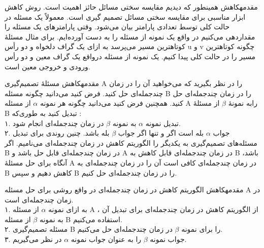 \begin{itemframe-s}{مقدمه}{کاهش}
\itm
همینطور که دیدیم مقایسه سختی مسائل حائز اهمیت است. روش کاهش ابزار مناسبی برای مقایسه سختی مسائل تصمیم گیری است.
\itm
معمولاً یک مسئله در حالت کلی توسط تعدادی پارامتر بیان می‌شود. وقتی پارامترهای یک مسئله را مقداردهی می‌کنیم در واقع یک نمونه
از مسئله را به دست آورده‌ایم.
\itm
برای مثال مسئلهٔ کوتاهترین مسیر می‌پرسد به ازای یک گراف دلخواه و دو رأس u و v چگونه کوتاهترین مسیر را در حالت کلی پیدا کنیم. یک نمونه از مسئله درواقع یک گراف معین و دو رأس ورودی و خروجی معین است.
\end{itemframe-s}

\begin{itemframe-s}{مقدمه}{کاهش}
\itm
مسئلهٔ تصمیم‌گیری A را در نظر بگیرید که می‌خواهید آن را در زمان چندجمله‌ای حل کنید.
\itm
فرض کنید می‌دانید چگونه مسئله B را در زمان چند‌جمله‌ای حل کنید.
\itm
همچنین فرض کنید می‌دانید چگونه هر نمونه
$\alpha$
از مسئله A رابه نمونهٔ
$\beta$
از مسئلهٔ B تبدیل کنید به طوری‌که :\\
۱. تبدیل نمونه
$\alpha$
به نمونه
$\beta$
در زمان چند‌جمله‌ای انجام شود.\\
۲. جواب
$\alpha$
بله است اگر و تنها اگر جواب
$\beta$
بله باشد.
\itm
چنین روندی برای تبدیل مسئله‌های تصمیم‌گیری به یکدیگر را الگوریتم کاهش در زمان چندجمله‌ای
می‌نامیم.
\itm
اگر B در زمان چندجمله‌ای قابل حل باشد و A در زمان چندجمله‌ای قابل کاهش به B باشد، آنگاه برای حل مسئلهٔ A در زمان چندجمله‌ای کافی است آن را در زمان چندجمله‌ای به B کاهش دهیم و سپس B را در زمان چندجمله‌ای حل کنیم.
\end{itemframe-s}

\begin{itemframe-s}{مقدمه}{کاهش}
\itm
الگوریتم کاهش در زمان چندجمله‌ای در واقع روشی برای حل مسئله A در زمان چند‌جمله‌ای است.\\
۱. به ازای نمونه
$\alpha$
از مسئله A ، از الگوریتم کاهش در زمان چندجمله‌ای برای تبدیل آن به نمونه
$\beta$
از مسئله B استفاده می‌کنیم.\\
۲. مسئله تصمیم‌گیری B را برای نمونه
$\beta$
در زمان چندجمله‌ای حل می‌کنیم.\\
۳. جواب نمونه
$\beta$
را به عنوان جواب نمونه
$\alpha$
در نظر می‌گیریم.
\end{itemframe-s}

